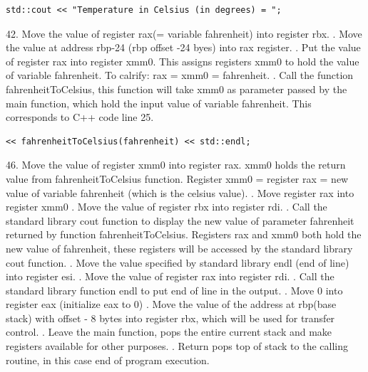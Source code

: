 \documentclass{article}
\theoremstyle{theorem}
\theoremstyle{definition}
\theoremstyle{remark}
\begin{document}
\begin{lstlisting}
std::cout << "Temperature in Celsius (in degrees) = ";
\end{lstlisting}
42. Move the value of register rax(= variable fahrenheit) into register rbx.
\newline {}. Move the value at address rbp-24 (rbp offset -24 byes) into rax register.
\newline {}. Put the value of register rax into register xmm0. This assigns registers xmm0 to hold the value of variable fahrenheit. To calrify: rax = xmm0 = fahrenheit.
\newline {}. Call the function fahrenheitToCelsius, this function will take xmm0 as parameter passed by the main function, which hold the input value of variable fahrenheit. This corresponds to C++ code line 25.
\begin{lstlisting}
<< fahrenheitToCelsius(fahrenheit) << std::endl;
\end{lstlisting}
46. Move the value of register xmm0 into register rax. xmm0 holds the return value from fahrenheitToCelsius function. Register xmm0 = register rax = new value of variable fahrenheit (which is the celsius value).
\newline {}. Move register rax into register xmm0
\newline {}. Move the value of register rbx into register rdi.
\newline {}. Call the standard library cout function to display the new value of parameter fahrenheit returned by function fahrenheitToCelsius. Registers rax and xmm0 both hold the new value of fahrenheit, these registers will be accessed by the standard library cout function.
\newline {}. Move the value specified by standard library endl (end of line) into register esi.
\newline {}. Move the value of register rax into register rdi.
\newline {}. Call the standard library function endl to put end of line in the output.
\newline {}. Move 0 into register eax (initialize eax to 0)
\newline {}. Move the value of the address at rbp(base stack) with offset - 8 bytes into register rbx, which will be used for transfer control.
\newline {}. Leave the main function, pops the entire current stack and make registers available for other purposes.
\newline {}. Return pops top of stack to the calling routine, in this case end of program execution.
\end{document}
